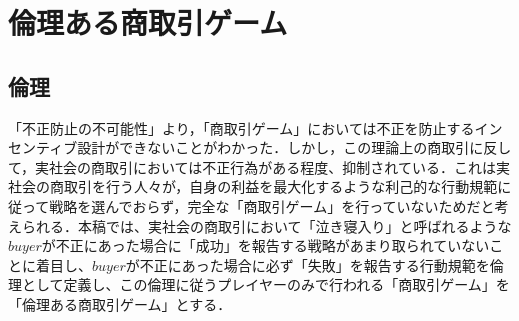 
\section{倫理ある商取引ゲーム}

\subsection{倫理}
「不正防止の不可能性」より，「商取引ゲーム」においては不正を防止するインセンティブ設計ができないことがわかった．しかし，この理論上の商取引に反して，実社会の商取引においては不正行為がある程度、抑制されている．これは実社会の商取引を行う人々が，自身の利益を最大化するような利己的な行動規範に従って戦略を選んでおらず，完全な「商取引ゲーム」を行っていないためだと考えられる．本稿では、実社会の商取引において「泣き寝入り」と呼ばれるような$buyer$が不正にあった場合に「成功」を報告する戦略があまり取られていないことに着目し、$buyer$が不正にあった場合に必ず「失敗」を報告する行動規範を倫理として定義し、この倫理に従うプレイヤーのみで行われる「商取引ゲーム」を「倫理ある商取引ゲーム」とする．


